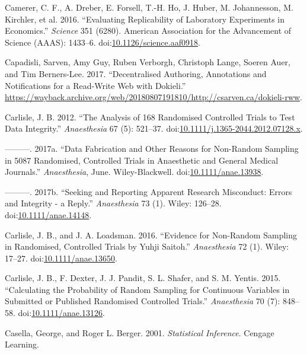 \documentclass[a5paper]{book}
\begin{document}
\hypertarget{ref-doi:10.1126ux2fscience.aaf0918}{}
Camerer, C. F., A. Dreber, E. Forsell, T.-H. Ho, J. Huber, M.
Johannesson, M. Kirchler, et al. 2016. ``Evaluating Replicability of
Laboratory Experiments in Economics.'' \emph{Science} 351 (6280).
American Association for the Advancement of Science (AAAS): 1433--6.
doi:\href{https://doi.org/10.1126/science.aaf0918}{10.1126/science.aaf0918}.

\hypertarget{ref-dokieli}{}
Capadisli, Sarven, Amy Guy, Ruben Verborgh, Christoph Lange, Soeren
Auer, and Tim Berners-Lee. 2017. ``Decentralised Authoring, Annotations
and Notifications for a Read-Write Web with Dokieli.''
\url{https://wayback.archive.org/web/20180807191810/http://csarven.ca/dokieli-rww}.

\hypertarget{ref-doi:10.1111ux2fj.1365-2044.2012.07128.x}{}
Carlisle, J. B. 2012. ``The Analysis of 168 Randomised Controlled Trials
to Test Data Integrity.'' \emph{Anaesthesia} 67 (5): 521--37.
doi:\href{https://doi.org/10.1111/j.1365-2044.2012.07128.x}{10.1111/j.1365-2044.2012.07128.x}.

\hypertarget{ref-doi:10.1111ux2fanae.13938}{}
---------. 2017a. ``Data Fabrication and Other Reasons for Non-Random
Sampling in 5087 Randomised, Controlled Trials in Anaesthetic and
General Medical Journals.'' \emph{Anaesthesia}, June. Wiley-Blackwell.
doi:\href{https://doi.org/10.1111/anae.13938}{10.1111/anae.13938}.

\hypertarget{ref-doi:10.1111ux2fanae.14148}{}
---------. 2017b. ``Seeking and Reporting Apparent Research Misconduct:
Errors and Integrity - a Reply.'' \emph{Anaesthesia} 73 (1). Wiley:
126--28.
doi:\href{https://doi.org/10.1111/anae.14148}{10.1111/anae.14148}.

\hypertarget{ref-doi:10.1111ux2fanae.13650}{}
Carlisle, J. B., and J. A. Loadsman. 2016. ``Evidence for Non-Random
Sampling in Randomised, Controlled Trials by Yuhji Saitoh.''
\emph{Anaesthesia} 72 (1). Wiley: 17--27.
doi:\href{https://doi.org/10.1111/anae.13650}{10.1111/anae.13650}.

\hypertarget{ref-doi:10.1111ux2fanae.13126}{}
Carlisle, J. B., F. Dexter, J. J. Pandit, S. L. Shafer, and S. M.
Yentis. 2015. ``Calculating the Probability of Random Sampling for
Continuous Variables in Submitted or Published Randomised Controlled
Trials.'' \emph{Anaesthesia} 70 (7): 848--58.
doi:\href{https://doi.org/10.1111/anae.13126}{10.1111/anae.13126}.

\hypertarget{ref-isbn:9780534243128}{}
Casella, George, and Roger L. Berger. 2001. \emph{Statistical
Inference}. Cengage Learning.
\end{document}
